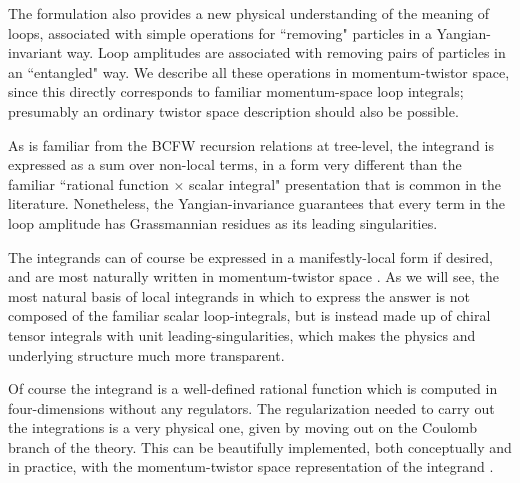 \documentclass[11pt, reqno]{article}
\begin{document}
The formulation also provides a new physical understanding of the
meaning of loops, associated with simple operations for
``removing" particles in a Yangian-invariant way. Loop amplitudes
are associated with removing pairs of particles in an ``entangled" way. We describe all these operations in momentum-twistor space, since this directly corresponds to familiar momentum-space loop integrals; presumably an ordinary twistor space description should also be possible.

As is familiar from the BCFW recursion relations at tree-level,
the integrand is expressed as a sum over non-local terms, in a form very different than the familiar ``rational function $\times$ scalar integral" presentation that is common in the literature. Nonetheless, the Yangian-invariance guarantees that every term in the loop amplitude has Grassmannian residues as its leading singularities.

The integrands can of course be expressed in a manifestly-local form if desired, and are most naturally written in momentum-twistor space \cite{Hodges:2010kq,Mason:2010pg}.
As we will see, the most natural basis of local integrands in which to express the answer is not composed of the familiar scalar loop-integrals, but is instead made up of chiral tensor integrals with unit leading-singularities, which makes the physics and underlying structure much more transparent.

Of course the integrand is a well-defined rational function which is computed in four-dimensions without any regulators. The regularization needed to carry out the integrations is a very physical one, given by moving out on the Coulomb branch \cite{Alday:2009zm} of the theory. This can be beautifully implemented, both conceptually and in practice, with the momentum-twistor space representation of the integrand \cite{Hodges:2010kq,Mason:2010pg}.
\end{document}
